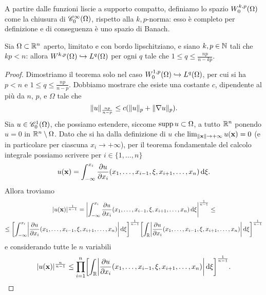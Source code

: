 A partire dalle funzioni liscie a supporto compatto, definiamo lo spazio $\sobWc[k,p]{\Omega}$ come la chiusura di $\contsc[\infty]{\Omega}$, rispetto alla $k,p$-norma: esso è completo per definizione e di conseguenza è uno spazio di Banach.
\begin{teorema}[Sobolev] \label{t:sobolev}
    Sia $\Omega\subset\R^n$ aperto, limitato e con bordo lipschitziano, e siano $k,p\in\N$ tali che $kp<n$: allora $\sobW[k,p]{\Omega}\emb\leb[q]{\Omega}$ per ogni $q$ tale che $1\le q\le\frac{np}{n-kp}$.
\end{teorema}
\begin{proof}
    Dimostriamo il teorema solo nel caso $\sobWc[1,p]{\Omega}\emb\leb[q]{\Omega}$, per cui si ha $p<n$ e $1\le q\le\frac{np}{n-p}$.
    Dobbiamo mostrare che esiste una costante $c$, dipendente al più da $n$, $p$, e $\Omega$ tale che
    \begin{equation}
        \norm{u}_\frac{np}{n-p}\le c(\norm{u}_p+\norm{\grad u}_p).
        \label{eq:dim-sobolev-obiettivo}
    \end{equation}
    Sia $u\in\contsc[1]{\Omega}$, che possiamo estendere, siccome $\supp u\subset\Omega$, a tutto $\R^n$ ponendo $u=0$ in $\R^n\setminus\Omega$.
    Dato che si ha dalla definizione di $u$ che $\lim_{\norm{\vec x}\to+\infty}u(\vec x)=0$ (e in particolare per ciascuna $x_i\to+\infty$), per il teorema fondamentale del calcolo integrale possiamo scrivere per $i\in\{1,\dotsc,n\}$
    \begin{equation}
        u(\vec x)=\int_{-\infty}^{x_i}\drp{u}{x_i}(x_1,\dotsc,x_{i-1},\xi,x_{i+1},\dotsc,x_n)\,\dd\xi.
    \end{equation}
    Allora troviamo
    \begin{multline}
        \abs{u(\vec x)}^\frac1{n-1}=
        \abs[\bigg]{\int_{-\infty}^{x_i}\drp{u}{x_i}(x_1,\dotsc,x_{i-1},\xi,x_{i+1},\dotsc,x_n)\,\dd\xi}^\frac1{n-1}\le\\ \le
        \biggl[\int_{-\infty}^{x_i}\abs[\bigg]{\drp{u}{x_i}(x_1,\dotsc,x_{i-1},\xi,x_{i+1},\dotsc,x_n)}\,\dd\xi\biggr]^\frac1{n-1}
        \biggl[\int_\R\abs[\bigg]{\drp{u}{x_i}(x_1,\dotsc,x_{i-1},\xi,x_{i+1},\dotsc,x_n)}\,\dd\xi\biggr]^\frac1{n-1}
    \end{multline}
    e considerando tutte le $n$ variabili
    \begin{equation}
        \abs{u(\vec x)}^\frac{n}{n-1}\le
        \prod_{i=1}^n\biggl[\int_\R\abs[\bigg]{\drp{u}{x_i}(x_1,\dotsc,x_{i-1},\xi,x_{i+1},\dotsc,x_n)}\,\dd\xi\biggr]^\frac1{n-1}.
    \end{equation}

\end{proof}
